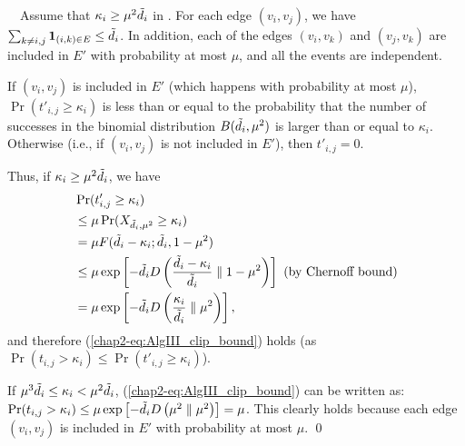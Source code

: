 {\smallskip
{}~~Assume that $\kappa_i \geq \mu^2 \tilde{d}_i$ in \AlgThree{}.
For each edge $(v_i,v_j)$, we have $\sum_{k \ne i,j} \textbf{1}_{(i,k) \in E} \leq \tilde{d}_i$.
In addition, each of the edges $(v_i,v_k)$ and
$(v_j,v_k)$ are included in $E'$ with probability at most $\mu$, and all the events are independent.

If $(v_i,v_j)$ is included in $E'$ (which happens with probability at most $\mu$), $\Pr(t'_{i,j} \geq \kappa_i)$ is less than or equal to the probability that the number of successes in the binomial distribution $B(\tilde{d}_i, \mu^2)$ is larger than or equal to $\kappa_i$.
Otherwise (i.e., if $(v_i,v_j)$ is not included in $E'$), then $t'_{i,j} = 0$.

Thus, if $\kappa_i \geq \mu^2 \tilde{d}_i$, we have
\begin{align*}
    &\Pr(t'_{i,j} \geq \kappa_i) \\
    &\leq \mu \Pr(X_{\tilde{d}_i, \mu^2} \geq \kappa_i) \\
    &= \mu F(\tilde{d}_i - \kappa_i; \tilde{d}_i, 1-\mu^2) \\
    &\leq \mu \exp \left[-\tilde{d}_i D \left(\frac{\tilde{d}_i - \kappa_i}{\tilde{d}_i} \parallel 1-\mu^2 \right) \right]  ~ \text{(by Chernoff bound)}\\
    &= \mu \exp \left[-\tilde{d}_i D \left(\frac{\kappa_i}{\tilde{d}_i} \parallel \mu^2 \right) \right],
\end{align*}
and therefore (\ref{chap2-eq:AlgIII_clip_bound}) holds (as $\Pr(t_{i,j} > \kappa_i) \leq \Pr(t'_{i,j} \geq \kappa_i)$).


If $\mu^3 \tilde{d}_i \leq \kappa_i < \mu^2 \tilde{d}_i$, (\ref{chap2-eq:AlgIII_clip_bound}) can be written as: $\Pr(t_{i,j} > \kappa_i) \leq \mu \exp \left[-\tilde{d}_i D \left(\mu^2 \parallel \mu^2 \right) \right] = \mu$.
This clearly holds because each edge $(v_i,v_j)$ is included in $E'$ with probability at most $\mu$.
\qed
}
